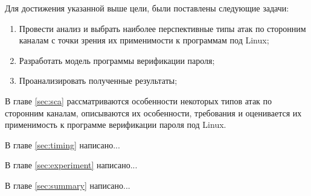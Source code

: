 Для достижения указанной выше цели, были поставлены следующие задачи:
\begin{enumerate}
\item Провести анализ и выбрать наиболее перспективные типы атак по сторонним
  каналам с точки зрения их применимости к программам под Linux;
\item Разработать модель программы верификации пароля;
\item Проанализировать полученные результаты;
\end{enumerate}

В главе \ref{sec:sca} рассматриваются особенности некоторых типов атак по
сторонним каналам, описываются их особенности, требования и оценивается
их применимость к программе верификации пароля под Linux.

В главе \ref{sec:timing} написано...

В главе \ref{sec:experiment} написано...

В главе \ref{sec:summary} написано...

\clearpage

